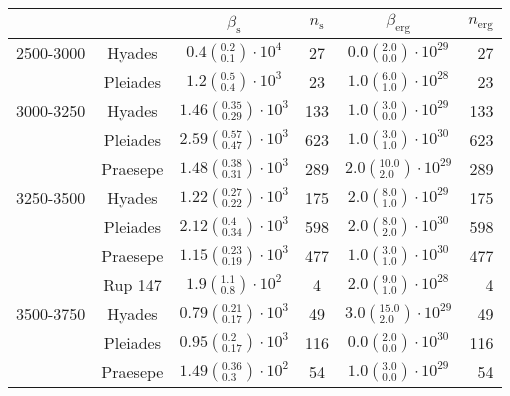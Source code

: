 \begin{tabular}{lccccr}
\hline\hline
          &         &                             $\beta_\mathrm{s}$ & $n_\mathrm{s}$ &                          $\beta_\mathrm{erg}$ & $n_\mathrm{erg}$ \\
\hline
2500-3000 & Hyades &     $0.4\left(^{0.2}_{0.1}\right)\cdot 10^{4}$ &             27 &   $0.0\left(^{2.0}_{0.0}\right)\cdot 10^{29}$ &               27 \\
          & Pleiades &     $1.2\left(^{0.5}_{0.4}\right)\cdot 10^{3}$ &             23 &   $1.0\left(^{6.0}_{1.0}\right)\cdot 10^{28}$ &               23 \\
3000-3250 & Hyades &  $1.46\left(^{0.35}_{0.29}\right)\cdot 10^{3}$ &            133 &   $1.0\left(^{3.0}_{0.0}\right)\cdot 10^{29}$ &              133 \\
          & Pleiades &  $2.59\left(^{0.57}_{0.47}\right)\cdot 10^{3}$ &            623 &   $1.0\left(^{3.0}_{1.0}\right)\cdot 10^{30}$ &              623 \\
          & Praesepe &  $1.48\left(^{0.38}_{0.31}\right)\cdot 10^{3}$ &            289 &  $2.0\left(^{10.0}_{2.0}\right)\cdot 10^{29}$ &              289 \\
3250-3500 & Hyades &  $1.22\left(^{0.27}_{0.22}\right)\cdot 10^{3}$ &            175 &   $2.0\left(^{8.0}_{1.0}\right)\cdot 10^{29}$ &              175 \\
          & Pleiades &   $2.12\left(^{0.4}_{0.34}\right)\cdot 10^{3}$ &            598 &   $2.0\left(^{8.0}_{2.0}\right)\cdot 10^{30}$ &              598 \\
          & Praesepe &  $1.15\left(^{0.23}_{0.19}\right)\cdot 10^{3}$ &            477 &   $1.0\left(^{3.0}_{1.0}\right)\cdot 10^{30}$ &              477 \\
          & Rup 147 &     $1.9\left(^{1.1}_{0.8}\right)\cdot 10^{2}$ &              4 &   $2.0\left(^{9.0}_{1.0}\right)\cdot 10^{28}$ &                4 \\
3500-3750 & Hyades &  $0.79\left(^{0.21}_{0.17}\right)\cdot 10^{3}$ &             49 &  $3.0\left(^{15.0}_{2.0}\right)\cdot 10^{29}$ &               49 \\
          & Pleiades &   $0.95\left(^{0.2}_{0.17}\right)\cdot 10^{3}$ &            116 &   $0.0\left(^{2.0}_{0.0}\right)\cdot 10^{30}$ &              116 \\
          & Praesepe &   $1.49\left(^{0.36}_{0.3}\right)\cdot 10^{2}$ &             54 &   $1.0\left(^{3.0}_{0.0}\right)\cdot 10^{29}$ &               54 \\

\end{tabular}

